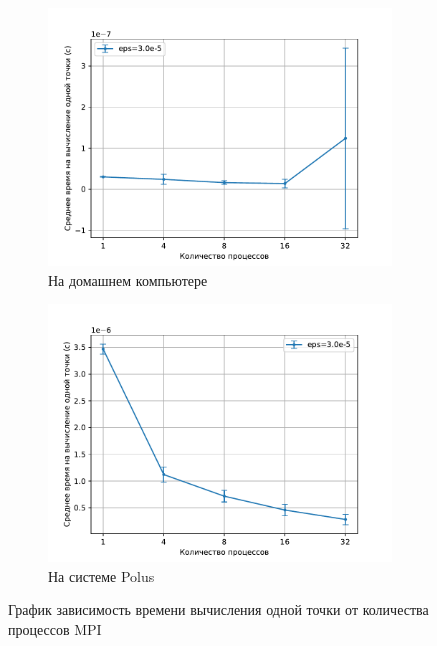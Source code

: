 \documentclass{article}
\begin{document}
\begin{figure}[!t]
\centering
\begin{subfigure}[b]{0.49\textwidth}
    \centering
    \includegraphics[width=\textwidth,trim=0 0 0 0,clip]{3.0e-5_home_pc_time_pp.pdf}
    \caption{На домашнем компьютере}
    \label{img:3.1}
\end{subfigure}
\begin{subfigure}[b]{0.49\textwidth}
    \centering
    \includegraphics[width=\textwidth,trim=0 0 0 0,clip]{3.0e-5_polus_time_pp.pdf}
    \caption{На системе Polus}
    \label{img:3.2}
\end{subfigure}
\caption{График зависимость времени вычисления одной точки от количества процессов MPI}
\end{figure}
\end{document}
